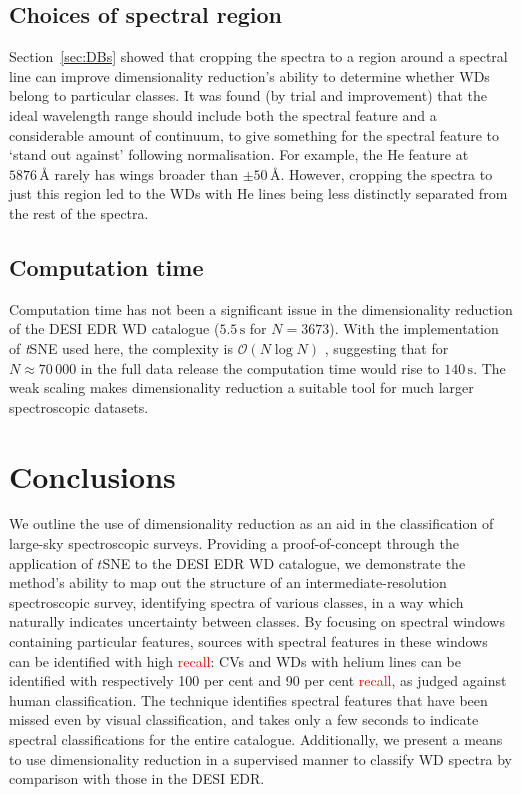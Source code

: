 \documentclass[fleqn,usenatbib]{mnras}
\newcommand{\red}[1]{\textcolor{red}{#1}}
\begin{document}
\subsection{Choices of spectral region}

Section~\ref{sec:DBs} showed that cropping the spectra to a region around a spectral line can improve dimensionality reduction's ability to determine whether WDs belong to particular classes.
It was found (by trial and improvement) that the ideal wavelength range should include both the spectral feature and a considerable amount of continuum, to give something for the spectral feature to `stand out against' following normalisation.
For example, the He feature at $5876\,\text{\AA}$ rarely has wings broader than $\pm50\,\text{\AA}$.
However, cropping the spectra to just this region led to the WDs with He lines being less distinctly separated from the rest of the spectra.


\subsection{Computation time}

Computation time has not been a significant issue in the dimensionality reduction of the DESI EDR WD catalogue ($5.5\,\text{s}$ for $N=3673$).
With the implementation of \textit{t}SNE used here, the complexity is $\mathcal{O}(N\log N)$ \citep{barneshut, vandermaaten14}, suggesting that for $N\approx 70\,000$ in the full data release the computation time would rise to $140\,\text{s}$.
The weak scaling makes dimensionality reduction a suitable tool for much larger spectroscopic datasets.

\section{Conclusions}
\label{sec:conclusions}

We outline the use of dimensionality reduction as an aid in the classification of large-sky spectroscopic surveys.
Providing a proof-of-concept through the application of $t$SNE to the DESI EDR WD catalogue, we demonstrate the method's ability to map out the structure of an intermediate-resolution spectroscopic survey, identifying spectra of various classes, in a way which naturally indicates uncertainty between classes.
By focusing on spectral windows containing particular features, sources with spectral features in these windows can be identified with high \red{recall}: CVs and WDs with helium lines can be identified with respectively 100 per cent and 90 per cent \red{recall}, as judged against human classification.
The technique identifies spectral features that have been missed even by visual classification, and takes only a few seconds to indicate spectral classifications for the entire catalogue.
Additionally, we present a means to use dimensionality reduction in a supervised manner to classify WD spectra by comparison with those in the DESI EDR.
\end{document}

